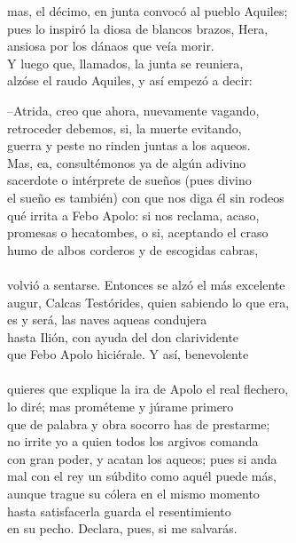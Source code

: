 mas, el décimo, en junta convocó al pueblo Aquiles;\\
pues lo inspiró la diosa de blancos brazos, Hera,\\
ansiosa por los dánaos que veía morir.\\
Y luego que, llamados, la junta se reuniera,\\
alzóse el raudo Aquiles, y así empezó a decir:\par
--Atrida, creo que ahora, nuevamente vagando,\\
retroceder debemos, si, la muerte evitando,\\
guerra y peste no rinden juntas a los aqueos.\\
Mas, ea, consultémonos ya de algún adivino\\
sacerdote o intérprete de sueños (pues divino\\
el sueño es también) con que nos diga él sin rodeos\\
qué irrita a Febo Apolo: si nos reclama, acaso,\\
promesas o hecatombes, o si, aceptando el craso\\
humo de albos corderos y de escogidas cabras,\\
\\
volvió a sentarse. Entonces se alzó el más excelente\\
augur, Calcas Testórides, quien sabiendo lo que era,\\
es y será, las naves aqueas condujera\\
hasta Ilión, con ayuda del don clarividente\\
que Febo Apolo hiciérale. Y así, benevolente\\
\\
quieres que explique la ira de Apolo el real flechero,\\
lo diré; mas prométeme y júrame primero\\
que de palabra y obra socorro has de prestarme;\\
no irrite yo a quien todos los argivos comanda\\
con gran poder, y acatan los aqueos; pues si anda\\
mal con el rey un súbdito como aquél puede más,\\
aunque trague su cólera en el mismo momento\\
hasta satisfacerla guarda el resentimiento\\
en su pecho. Declara, pues, si me salvarás.\par
